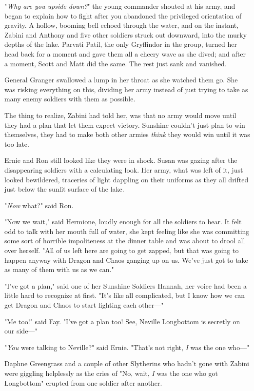 "\emph{Why are you upside down?}" the young commander shouted at his army, and
began to explain how to fight after you abandoned the privileged orientation of
gravity.
\sbreak
A hollow, booming bell echoed through the water, and on the instant, Zabini and
Anthony and five other soldiers struck out downward, into the murky depths of
the lake. Parvati Patil, the only Gryffindor in the group, turned her head back
for a moment and gave them all a cheery wave as she dived; and after a moment,
Scott and Matt did the same. The rest just sank and vanished.

General Granger swallowed a lump in her throat as she watched them go. She was
risking everything on this, dividing her army instead of just trying to take as
many enemy soldiers with them as possible.

The thing to realize, Zabini had told her, was that no army would move until
they had a plan that let them expect victory. Sunshine couldn't just plan to
win themselves, they had to make both other armies \emph{think} they would win
until it was too late.

Ernie and Ron still looked like they were in shock. Susan was gazing after the
disappearing soldiers with a calculating look. Her army, what was left of it,
just looked bewildered, traceries of light dappling on their uniforms as they
all drifted just below the sunlit surface of the lake.

"\emph{Now} what?" said Ron.

"Now we wait," said Hermione, loudly enough for all the soldiers to hear. It
felt odd to talk with her mouth full of water, she kept feeling like she was
committing some sort of horrible impoliteness at the dinner table and was about
to drool all over herself. "All of us left here are going to get zapped, but
that was going to happen anyway with Dragon and Chaos ganging up on us. We've
just got to take as many of them with us as we can."

"I've got a plan," said one of her Sunshine Soldiers{\el} Hannah, her voice
had been a little hard to recognize at first. "It's like all complicated, but I
know how we can get Dragon and Chaos to start fighting each other---"

"Me too!" said Fay. "I've got a plan too! See, Neville Longbottom is secretly
on our side---"

"\emph{You} were talking to Neville?" said Ernie. "That's not right, \emph{I}
was the one who---"

Daphne Greengrass and a couple of other Slytherins who hadn't gone with Zabini
were giggling helplessly as the cries of "No, wait, \emph{I} was the one who
got Longbottom" erupted from one soldier after another.

